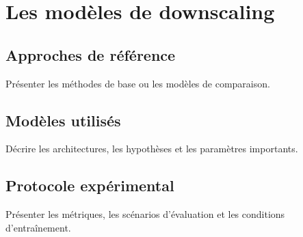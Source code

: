 \chapter{Les modèles de downscaling}\label{chap:modeles}
\chaptertoc

\section{Approches de référence}
Présenter les méthodes de base ou les modèles de comparaison.

\section{Modèles utilisés}
Décrire les architectures, les hypothèses et les paramètres importants.

\section{Protocole expérimental}
Présenter les métriques, les scénarios d'évaluation et les conditions d'entraînement.
